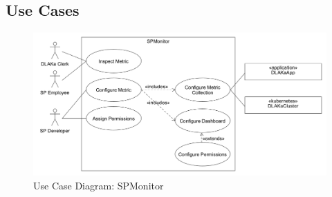 \subsection{Use Cases}

\begin{figure}
	\centering
	\includegraphics[width=\textwidth]{figures/2.1_use_case_spmonitor.png}
	\caption{Use Case Diagram: SPMonitor}
	\label{fig:use_case_diagram_spmonitor}
\end{figure}



